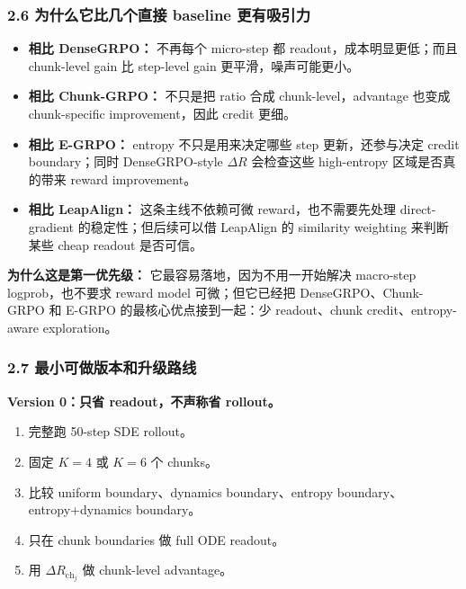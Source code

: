 \subsubsection{2.6 为什么它比几个直接 baseline 更有吸引力}

\begin{itemize}[leftmargin=1.5em]
  \item \textbf{相比 DenseGRPO：} 不再每个 micro-step 都 readout，成本明显更低；而且 chunk-level gain 比 step-level gain 更平滑，噪声可能更小。
  \item \textbf{相比 Chunk-GRPO：} 不只是把 ratio 合成 chunk-level，advantage 也变成 chunk-specific improvement，因此 credit 更细。
  \item \textbf{相比 E-GRPO：} entropy 不只是用来决定哪些 step 更新，还参与决定 credit boundary；同时 DenseGRPO-style \(\Delta R\) 会检查这些 high-entropy 区域是否真的带来 reward improvement。
  \item \textbf{相比 LeapAlign：} 这条主线不依赖可微 reward，也不需要先处理 direct-gradient 的稳定性；但后续可以借 LeapAlign 的 similarity weighting 来判断某些 cheap readout 是否可信。
\end{itemize}

\begin{summarybox}
\textbf{为什么这是第一优先级：} 它最容易落地，因为不用一开始解决 macro-step logprob，也不要求 reward model 可微；但它已经把 DenseGRPO、Chunk-GRPO 和 E-GRPO 的最核心优点接到一起：少 readout、chunk credit、entropy-aware exploration。
\end{summarybox}

\subsubsection{2.7 最小可做版本和升级路线}

\textbf{Version 0：只省 readout，不声称省 rollout。}

\begin{enumerate}[leftmargin=1.5em]
  \item 完整跑 50-step SDE rollout。
  \item 固定 \(K=4\) 或 \(K=6\) 个 chunks。
  \item 比较 uniform boundary、dynamics boundary、entropy boundary、entropy+dynamics boundary。
  \item 只在 chunk boundaries 做 full ODE readout。
  \item 用 \(\Delta R_{\mathrm{ch}_j}\) 做 chunk-level advantage。
\end{enumerate}

